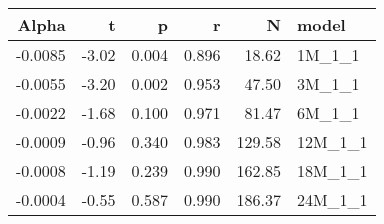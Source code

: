 \begin{table}[ht]
\centering
\begin{tabular}{rrrrrl}
  \hline
Alpha & t & p & r & N & model \\ 
  \hline
-0.0085 & -3.02 & 0.004 & 0.896 & 18.62 & 1M\_1\_1 \\ 
  -0.0055 & -3.20 & 0.002 & 0.953 & 47.50 & 3M\_1\_1 \\ 
  -0.0022 & -1.68 & 0.100 & 0.971 & 81.47 & 6M\_1\_1 \\ 
  -0.0009 & -0.96 & 0.340 & 0.983 & 129.58 & 12M\_1\_1 \\ 
  -0.0008 & -1.19 & 0.239 & 0.990 & 162.85 & 18M\_1\_1 \\ 
  -0.0004 & -0.55 & 0.587 & 0.990 & 186.37 & 24M\_1\_1 \\ 
   \hline
\end{tabular}
\end{table}

